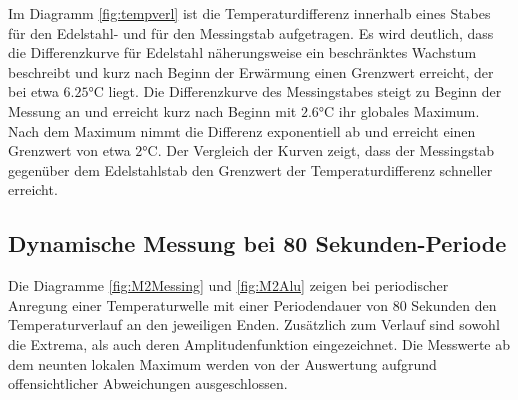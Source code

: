 Im Diagramm \ref{fig:tempverl} ist die Temperaturdifferenz innerhalb eines Stabes für den Edelstahl- und für den Messingstab aufgetragen. 
Es wird deutlich, dass die Differenzkurve für Edelstahl näherungsweise ein beschränktes Wachstum beschreibt und kurz nach Beginn der Erwärmung einen Grenzwert erreicht, der bei etwa  $6.25 \si{\degreeCelsius}$ liegt.
Die Differenzkurve des Messingstabes steigt zu Beginn der Messung an und erreicht kurz nach Beginn mit $2.6 \si{\degreeCelsius}$ ihr globales Maximum. 
Nach dem Maximum nimmt die Differenz exponentiell ab und erreicht einen Grenzwert von etwa $2 \si{\degreeCelsius}$.
Der Vergleich der Kurven zeigt, dass der Messingstab gegenüber dem Edelstahlstab den Grenzwert der Temperaturdifferenz schneller erreicht.

\subsection{Dynamische Messung bei 80 Sekunden-Periode}
Die Diagramme \ref{fig:M2Messing} und \ref{fig:M2Alu} zeigen bei periodischer Anregung einer Temperaturwelle mit einer Periodendauer von 80 Sekunden den Temperaturverlauf an den jeweiligen Enden. 
Zusätzlich zum Verlauf sind sowohl die Extrema, als auch deren Amplitudenfunktion eingezeichnet. 
Die Messwerte ab dem neunten lokalen Maximum werden von der Auswertung aufgrund offensichtlicher Abweichungen ausgeschlossen.


